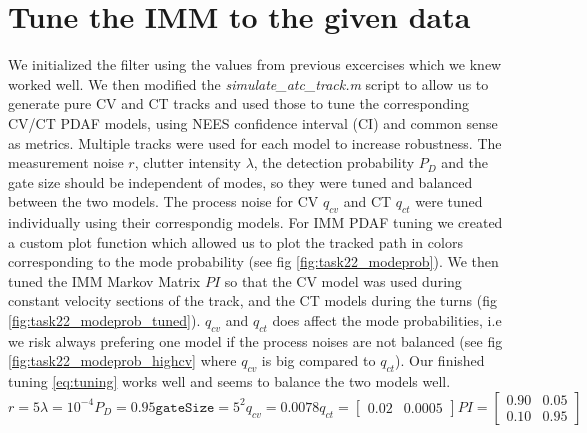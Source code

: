 \section{Tune the IMM to the given data}

We initialized the filter using the values from previous excercises which we knew worked well. We then modified the \textit{simulate\_atc\_track.m} script to allow us to generate pure CV and CT tracks and used those to tune the corresponding CV/CT PDAF models, using NEES confidence interval (CI) and common sense as metrics. Multiple tracks were used for each model to increase robustness. The measurement noise $r$, clutter intensity $\lambda$, the detection probability $P_D$ and the gate size should be independent of modes, so they were tuned and balanced between the two models. The process noise for CV $q_{cv}$ and CT $q_{ct}$ were tuned individually using their correspondig models. For IMM PDAF tuning we created a custom plot function which allowed us to plot the tracked path in colors corresponding to the mode probability (see fig \ref{fig:task22_modeprob}). We then tuned the IMM Markov Matrix $PI$ so that the CV model was used during constant velocity sections of the track, and the CT models during the turns (fig \ref{fig:task22_modeprob_tuned}). $q_{cv}$ and $q_{ct}$ does affect the mode probabilities, i.e we risk always prefering one model if the process noises are not balanced (see fig \ref{fig:task22_modeprob_highcv} where $q_{cv}$ is big compared to $q_{ct}$). Our finished tuning \ref{eq:tuning} works well and seems to balance the two models well.
\begin{subequations} \label{eq:tuning}
    \begin{equation}
        r = 5
    \end{equation}
    \begin{equation}
        \lambda = 10^{-4} 
    \end{equation}
    \begin{equation}
        P_D = 0.95
    \end{equation}
    \begin{equation}
        \texttt{gateSize} = 5^2 
    \end{equation}
    \begin{equation}
        q_{cv} = 0.0078 
    \end{equation}
    \begin{equation}
        q_{ct} = \begin{bmatrix}0.02 & 0.0005\end{bmatrix}
    \end{equation}
    \begin{equation}
        PI = \begin{bmatrix}0.90 & 0.05 \\ 0.10 & 0.95\end{bmatrix}
    \end{equation}
\end{subequations}

